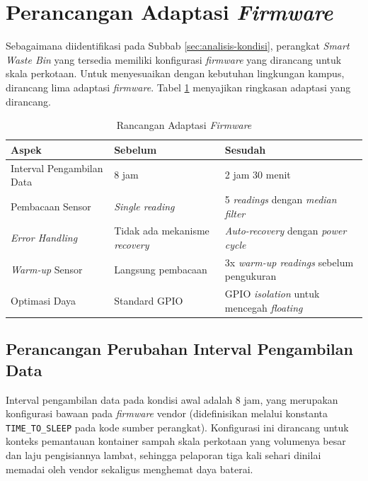 \section{Perancangan Adaptasi \textit{Firmware}}
\label{sec:perancangan-firmware}

Sebagaimana diidentifikasi pada Subbab \ref{sec:analisis-kondisi}, perangkat \textit{Smart Waste Bin} yang tersedia memiliki konfigurasi \textit{firmware} yang dirancang untuk skala perkotaan. Untuk menyesuaikan dengan kebutuhan lingkungan kampus, dirancang lima adaptasi \textit{firmware}. Tabel \ref{tab:peningkatan-firmware} menyajikan ringkasan adaptasi yang dirancang.

\begin{table}[H]
  \caption{Rancangan Adaptasi \textit{Firmware}}
  \label{tab:peningkatan-firmware}
  \begin{tabularx}{\textwidth}{| X | X | X |}
    \hline
    \textbf{Aspek} & \textbf{Sebelum} & \textbf{Sesudah} \\
    \hline
    Interval Pengambilan Data & 8 jam & 2 jam 30 menit \\
    \hline
    Pembacaan Sensor & \textit{Single reading} & 5 \textit{readings} dengan \textit{median filter} \\
    \hline
    \textit{Error Handling} & Tidak ada mekanisme \textit{recovery} & \textit{Auto-recovery} dengan \textit{power cycle} \\
    \hline
    \textit{Warm-up} Sensor & Langsung pembacaan & 3x \textit{warm-up readings} sebelum pengukuran \\
    \hline
    Optimasi Daya & Standard GPIO & GPIO \textit{isolation} untuk mencegah \textit{floating} \\
    \hline
  \end{tabularx}
\end{table}

\subsection{Perancangan Perubahan Interval Pengambilan Data}

Interval pengambilan data pada kondisi awal adalah 8 jam, yang merupakan konfigurasi bawaan pada \textit{firmware} vendor (didefinisikan melalui konstanta \texttt{TIME\_TO\_SLEEP} pada kode sumber perangkat). Konfigurasi ini dirancang untuk konteks pemantauan kontainer sampah skala perkotaan yang volumenya besar dan laju pengisiannya lambat, sehingga pelaporan tiga kali sehari dinilai memadai oleh vendor sekaligus menghemat daya baterai.

